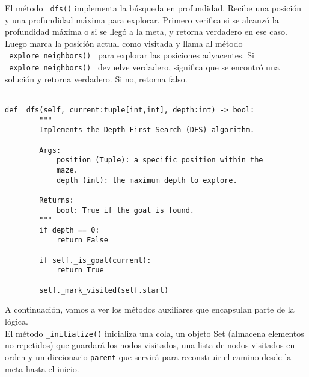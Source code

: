 \clearpage

El método \lstinline{_dfs()} implementa la búsqueda en profundidad. Recibe una posición y una profundidad máxima para explorar. Primero verifica si se alcanzó la profundidad máxima o si se llegó a la meta, y retorna verdadero en ese caso. Luego marca la posición actual como visitada y llama al método \lstinline{_explore_neighbors() } para explorar las posiciones adyacentes. Si \lstinline{_explore_neighbors() } devuelve verdadero, significa que se encontró una solución y retorna verdadero. Si no, retorna falso.\\\
    

\begin{lstlisting}
def _dfs(self, current:tuple[int,int], depth:int) -> bool:
        """
        Implements the Depth-First Search (DFS) algorithm.

        Args:
            position (Tuple): a specific position within the 
            maze.
            depth (int): the maximum depth to explore.

        Returns:
            bool: True if the goal is found.
        """
        if depth == 0:
            return False

        if self._is_goal(current):
            return True

        self._mark_visited(self.start)
\end{lstlisting}


\clearpage

A continuación, vamos a ver los métodos auxiliares que encapsulan parte de la lógica.\\\newline
El método \lstinline{_initialize()} inicializa una cola, un objeto Set (almacena elementos no repetidos) que guardará los nodos visitados, una lista de nodos visitados en orden y un diccionario \lstinline{parent} que servirá para reconstruir el camino desde la meta hasta el inicio.\\

